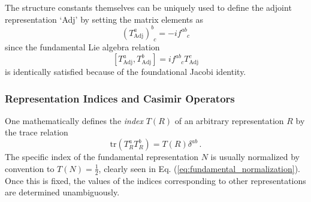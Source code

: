 The structure constants themselves can be uniquely used to define the adjoint representation `Adj' by setting the matrix elements as
\begin{equation} \label{eq:adjoint_def}
    (T_{\mathrm{Adj}}^a)^b_{\phantom{b}c} = -i f^{ab}_{\phantom{ab}c}
\end{equation}
since the fundamental Lie algebra relation
\begin{equation} \label{eq:adjoint_algebra}
    [T_{\mathrm{Adj}}^a, T_{\mathrm{Adj}}^b] = i f^{ab}_{\phantom{ab}c} T_{\mathrm{Adj}}^c
\end{equation}
is identically satisfied because of the foundational Jacobi identity.

\subsubsection{Representation Indices and Casimir Operators}

One mathematically defines the \textit{index} \(T(R)\) of an arbitrary representation \(R\) by the trace relation
\begin{equation} \label{eq:index_def}
    \mathrm{tr}(T_R^a T_R^b) = T(R) \delta^{ab} \, .
\end{equation}
The specific index of the fundamental representation \(N\) is usually normalized by convention to \(T(N) = \frac{1}{2}\), clearly seen in Eq. (\ref{eq:fundamental_normalization}). Once this is fixed, the values of the indices corresponding to other representations are determined unambiguously.

